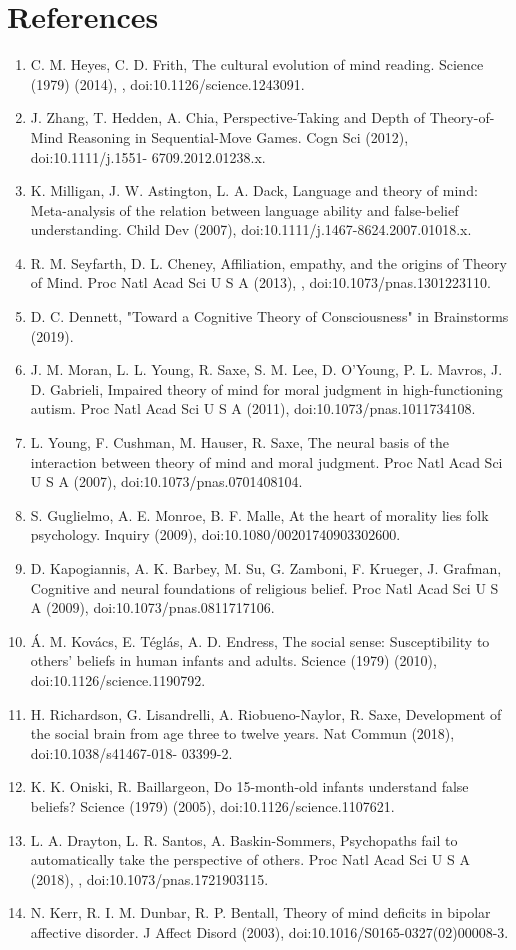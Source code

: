 \documentclass[11pt]{article}
\begin{document}
\section*{References}
\begin{enumerate}
\item C. M. Heyes, C. D. Frith, The cultural evolution of mind reading. Science (1979) (2014), , doi:10.1126/science.1243091.
\item J. Zhang, T. Hedden, A. Chia, Perspective-Taking and Depth of Theory-of-Mind Reasoning in Sequential-Move Games. Cogn Sci (2012), doi:10.1111/j.1551- 6709.2012.01238.x.
\item K. Milligan, J. W. Astington, L. A. Dack, Language and theory of mind: Meta-analysis of the relation between language ability and false-belief understanding. Child Dev (2007), doi:10.1111/j.1467-8624.2007.01018.x.
\item R. M. Seyfarth, D. L. Cheney, Affiliation, empathy, and the origins of Theory of Mind. Proc Natl Acad Sci U S A (2013), , doi:10.1073/pnas.1301223110.
\item D. C. Dennett, "Toward a Cognitive Theory of Consciousness" in Brainstorms (2019).
\item J. M. Moran, L. L. Young, R. Saxe, S. M. Lee, D. O’Young, P. L. Mavros, J. D. Gabrieli, Impaired theory of mind for moral judgment in high-functioning autism. Proc Natl Acad Sci U S A (2011), doi:10.1073/pnas.1011734108.
\item L. Young, F. Cushman, M. Hauser, R. Saxe, The neural basis of the interaction between theory of mind and moral judgment. Proc Natl Acad Sci U S A (2007), doi:10.1073/pnas.0701408104.
\item S. Guglielmo, A. E. Monroe, B. F. Malle, At the heart of morality lies folk psychology. Inquiry (2009), doi:10.1080/00201740903302600.
\item D. Kapogiannis, A. K. Barbey, M. Su, G. Zamboni, F. Krueger, J. Grafman, Cognitive and neural foundations of religious belief. Proc Natl Acad Sci U S A (2009), doi:10.1073/pnas.0811717106.
\item Á. M. Kovács, E. Téglás, A. D. Endress, The social sense: Susceptibility to others’ beliefs in human infants and adults. Science (1979) (2010), doi:10.1126/science.1190792.
\item H. Richardson, G. Lisandrelli, A. Riobueno-Naylor, R. Saxe, Development of the social brain from age three to twelve years. Nat Commun (2018), doi:10.1038/s41467-018- 03399-2.
\item K. K. Oniski, R. Baillargeon, Do 15-month-old infants understand false beliefs? Science (1979) (2005), doi:10.1126/science.1107621.
\item L. A. Drayton, L. R. Santos, A. Baskin-Sommers, Psychopaths fail to automatically take the perspective of others. Proc Natl Acad Sci U S A (2018), , doi:10.1073/pnas.1721903115.
\item N. Kerr, R. I. M. Dunbar, R. P. Bentall, Theory of mind deficits in bipolar affective disorder. J Affect Disord (2003), doi:10.1016/S0165-0327(02)00008-3.


\end{enumerate}
\end{document}
